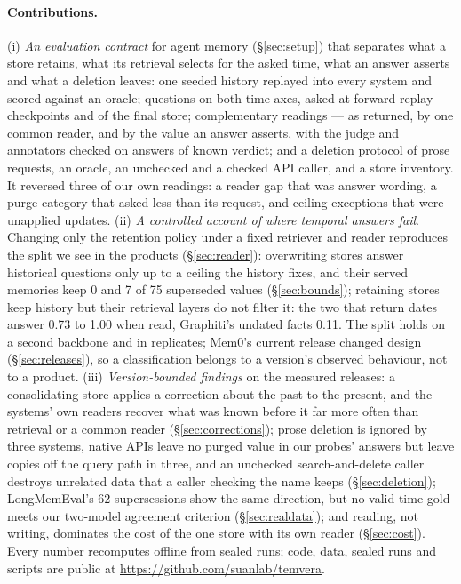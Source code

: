 \documentclass[conference]{IEEEtran}
\begin{document}
\paragraph{Contributions.}
(i) \emph{An evaluation contract} for agent memory (\S\ref{sec:setup}) that
separates what a store retains, what its retrieval selects for the asked time,
what an answer asserts and what a deletion leaves: one seeded history replayed
into every system and scored against an oracle; questions on both time axes,
asked at forward-replay checkpoints and of the final store; complementary
readings --- as returned, by one common reader, and by the value an answer
asserts, with the judge and annotators checked on answers of known verdict; and a deletion
protocol of prose requests, an oracle, an unchecked and a checked API caller,
and a store inventory. It reversed three of our own readings: a reader gap that
was answer wording, a purge category that asked less than its request, and
ceiling exceptions that were unapplied updates.
(ii) \emph{A controlled account of where temporal answers fail}. Changing only
the retention policy under a fixed retriever and reader reproduces the split we
see in the products (\S\ref{sec:reader}): overwriting stores answer historical
questions only up to a ceiling the history fixes, and their served memories
keep 0 and 7 of 75 superseded values (\S\ref{sec:bounds}); retaining stores
keep history but their retrieval layers do not filter it: the two that return
dates answer 0.73 to 1.00 when read, Graphiti's undated facts 0.11. The split
holds on a second backbone and in replicates; Mem0's current release changed
design (\S\ref{sec:releases}), so a classification belongs to a version's
observed behaviour, not to a product.
(iii) \emph{Version-bounded findings} on the measured releases: a consolidating
store applies a correction about the past to the present, and the systems' own
readers recover what was known before it far more often than retrieval or a
common reader (\S\ref{sec:corrections}); prose deletion is ignored by three
systems, native APIs leave no purged value in our probes' answers but leave
copies off the query path in three, and an unchecked search-and-delete caller
destroys unrelated data that a caller checking the name keeps
(\S\ref{sec:deletion}); LongMemEval's 62 supersessions show the same direction,
but no valid-time gold meets our two-model agreement criterion
(\S\ref{sec:realdata}); and reading, not writing, dominates the cost of the
one store with its own reader (\S\ref{sec:cost}).
Every number recomputes offline from sealed runs; code, data, sealed runs and
scripts are public at
\url{https://github.com/suanlab/temvera}.
\end{document}
